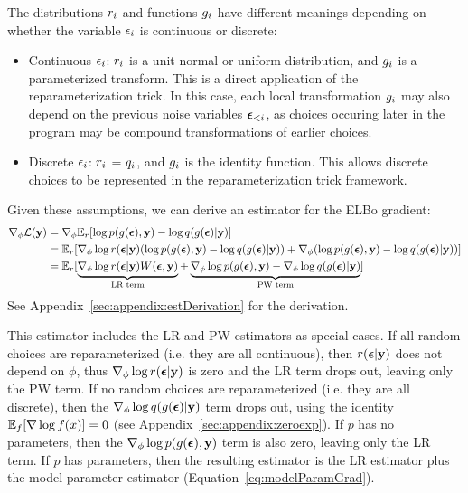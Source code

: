 The distributions $r_i$ and functions $g_i$ have different meanings depending on whether the variable $\epsilon_i$ is continuous or discrete:
\begin{itemize}
\item{Continuous $\epsilon_i$: $r_i$ is a unit normal or uniform distribution, and $g_i$ is a parameterized transform. This is a direct application of the reparameterization trick. In this case, each local transformation $g_i$ may also depend on the previous noise variables $\bm{\epsilon}_{<i}$, as choices occuring later in the program may be compound transformations of earlier choices.~}
\item{Discrete $\epsilon_i$: $r_i$ = $q_i$, and $g_i$ is the identity function. This allows discrete choices to be represented in the reparameterization trick framework.}
\end{itemize}
Given these assumptions, we can derive an estimator for the ELBo gradient:
\begin{align}
\label{eq:hybridEstimator}
\gradparams \elbo
%
&= \gradparams \expect_\reparamDist [ \log p(\xformedVars, \observedVars) - \log \guide(\xformedVars | \observedVars) ]\\
%
&= \expect_\reparamDist [ \gradparams \log \reparamDist(\reparamVars | \observedVars) ( \log p(\xformedVars, \observedVars) - \log \guide(\xformedVars | \observedVars) ) + \gradparams( \log p(\xformedVars, \observedVars) - \log \guide(\xformedVars | \observedVars) )]\nonumber\\
%
&= \expect_\reparamDist [ \underbrace{\gradparams \log \reparamDist(\reparamVars | \observedVars) W(\reparamVars, \observedVars)}_{\text{LR term}} + \underbrace{\gradparams \log p(\xformedVars, \observedVars) - \gradparams \log \guide(\xformedVars | \observedVars)}_{\text{PW term}} ]\nonumber
\end{align}
See Appendix~\ref{sec:appendix:estDerivation} for the derivation. 

This estimator includes the LR and PW estimators as special cases. If all random choices are reparameterized (i.e. they are all continuous), then $r(\bm{\epsilon} | \mathbf{y})$ does not depend on $\phi$, thus $\nabla_\phi \log r(\bm{\epsilon} | \mathbf{y})$ is zero and the LR term drops out, leaving only the PW term. If no random choices are reparameterized (i.e. they are all discrete), then the $\nabla_\phi \log q(g(\bm{\epsilon}) | \mathbf{y})$ term drops out, using the identity $\mathbb{E}_f[\nabla \log f(x)] = 0$ (see Appendix~\ref{sec:appendix:zeroexp}). If $p$ has no parameters, then the $\nabla_\phi \log p(g(\bm{\epsilon}), \mathbf{y})$ term is also zero, leaving only the LR term. If $p$ has parameters, then the resulting estimator is the LR estimator plus the model parameter estimator (Equation~\ref{eq:modelParamGrad}).

